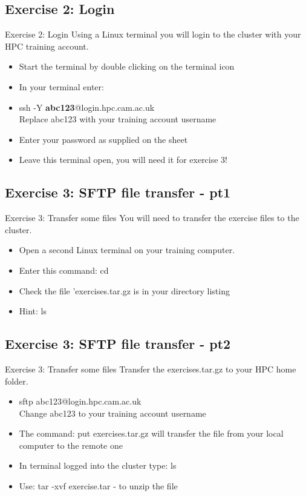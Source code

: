 \subsection{Exercise 2: Login}
\begin{frame}{Exercise 2: Login}
Using a Linux terminal you will login to the cluster with your HPC training account.
\begin{itemize}
\item{Start the terminal by double clicking on the terminal icon}
\item In your terminal enter:
\item{ssh -Y \textbf{abc123}@login.hpc.cam.ac.uk}\\
Replace abc123 with your training account username 
\item {Enter your password as supplied on the sheet}
\item{Leave this terminal open, you will need it for exercise 3!}
\end{itemize}
\end{frame}

\subsection{Exercise 3: SFTP file transfer - pt1}
\begin{frame}{Exercise 3: Transfer some files}
You will need to transfer the exercise files to the cluster.
\begin{itemize}
\item{Open a second Linux terminal on your training computer.}
\item{Enter this command: cd \alert{\footnotesize {}}}
\item{Check the file 'exercises.tar.gz is in your directory listing}
\item{Hint: ls}
\end{itemize}
\end{frame}

\subsection{Exercise 3: SFTP file transfer - pt2}
\begin{frame}{Exercise 3: Transfer some files}
Transfer the exercises.tar.gz to your HPC home folder.
\begin{itemize}
\item \alert{\footnotesize sftp abc123@login.hpc.cam.ac.uk}\\
Change abc123 to your training account username
\item{The command: \alert{\footnotesize put exercises.tar.gz} will transfer the file from your local computer to the remote one}
\item{In terminal logged into the cluster type: ls}
\item{Use: tar -xvf exercise.tar  - to unzip the file}
\end{itemize}
\end{frame}

